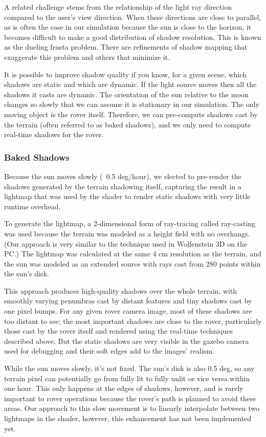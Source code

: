 \documentclass[twocolumn,letterpaper]{IEEEAerospaceCLS}  %
\begin{document}
A related challenge stems from the relationship of the light ray direction compared to the user's view direction. When these directions are close to parallel, as is often the case in our simulation because the sun is close to the horizon, it becomes difficult to make a good distribution of shadow resolution. This is known as the dueling frusta problem. There are refinements of shadow mapping that exaggerate this problem and others that minimize it.

It is possible to improve shadow quality if you know, for a given scene, which shadows are static and which are dynamic. If the light source moves then all the shadows it casts are dynamic. The orientation of the sun relative to the moon changes so slowly that we can assume it is stationary in our simulation. The only moving object is the rover itself. Therefore, we can pre-compute shadows cast by the terrain (often referred to as baked shadows), and we only need to compute real-time shadows for the rover.

\subsubsection{Baked Shadows}

Because the sun moves slowly (~0.5 deg/hour), we elected to pre-render the shadows generated by the terrain shadowing itself, capturing the result in a lightmap that was used by the shader to render static shadows with very little runtime overhead.

To generate the lightmap, a 2-dimensional form of ray-tracing called ray-casting was used because the terrain was modeled as a height field with no overhangs.  (Our approach is very similar to the technique used in Wolfenstein 3D on the PC.)  The lightmap was calculated at the same 4 cm resolution as the terrain, and the sun was modeled as an extended source with rays cast from 280 points within the sun's disk.

This approach produces high-quality shadows over the whole terrain, with smoothly varying penumbras cast by distant features and tiny shadows cast by one pixel bumps.  For any given rover camera image, most of these shadows are too distant to see; the most important shadows are close to the rover, particularly those cast by the rover itself and rendered using the real-time techniques described above.  But the static shadows are very visible in the gazebo camera used for debugging and their soft edges add to the images' realism.

While the sun moves slowly, it's not fixed.  The sun's disk is also 0.5 deg, so any terrain pixel can potentially go from fully lit to fully unlit or vice versa within one hour.  This only happens at the edges of shadows, however, and is rarely important to rover operations because the rover's path is planned to avoid these areas.  Our approach to this slow movement is to linearly interpolate between two lightmaps in the shader, however, this enhancement has not been implemented yet.
\end{document}
